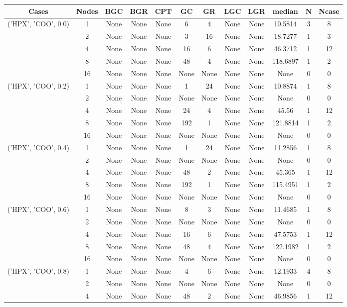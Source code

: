 \begin{tabular}{cccccccccccc}
\hline
Cases & Nodes& BGC& BGR& CPT& GC& GR& LGC& LGR& median & N & Ncase \\
\hline
\multirow{5}{*}{('HPX', 'COO', 0.0)}& 1& None& None& None& 6& 4& None& None& 10.5814& 3& 8\\
& 2& None& None& None& 3& 16& None& None& 18.7277& 1& 3\\
& 4& None& None& None& 16& 6& None& None& 46.3712& 1& 12\\
& 8& None& None& None& 48& 4& None& None& 118.6897& 1& 2\\
& 16& None& None& None& None& None& None& None& None& 0& 0\\
\hline
\multirow{5}{*}{('HPX', 'COO', 0.2)}& 1& None& None& None& 1& 24& None& None& 10.8874& 1& 8\\
& 2& None& None& None& None& None& None& None& None& 0& 0\\
& 4& None& None& None& 24& 4& None& None& 45.56& 1& 12\\
& 8& None& None& None& 192& 1& None& None& 121.8814& 1& 2\\
& 16& None& None& None& None& None& None& None& None& 0& 0\\
\hline
\multirow{5}{*}{('HPX', 'COO', 0.4)}& 1& None& None& None& 1& 24& None& None& 11.2856& 1& 8\\
& 2& None& None& None& None& None& None& None& None& 0& 0\\
& 4& None& None& None& 48& 2& None& None& 45.365& 1& 12\\
& 8& None& None& None& 192& 1& None& None& 115.4951& 1& 2\\
& 16& None& None& None& None& None& None& None& None& 0& 0\\
\hline
\multirow{5}{*}{('HPX', 'COO', 0.6)}& 1& None& None& None& 8& 3& None& None& 11.4685& 1& 8\\
& 2& None& None& None& None& None& None& None& None& 0& 0\\
& 4& None& None& None& 16& 6& None& None& 47.5753& 1& 12\\
& 8& None& None& None& 48& 4& None& None& 122.1982& 1& 2\\
& 16& None& None& None& None& None& None& None& None& 0& 0\\
\hline
\multirow{5}{*}{('HPX', 'COO', 0.8)}& 1& None& None& None& 4& 6& None& None& 12.1933& 4& 8\\
& 2& None& None& None& None& None& None& None& None& 0& 0\\
& 4& None& None& None& 48& 2& None& None& 46.9856& 1& 12\\

\end{tabular}
